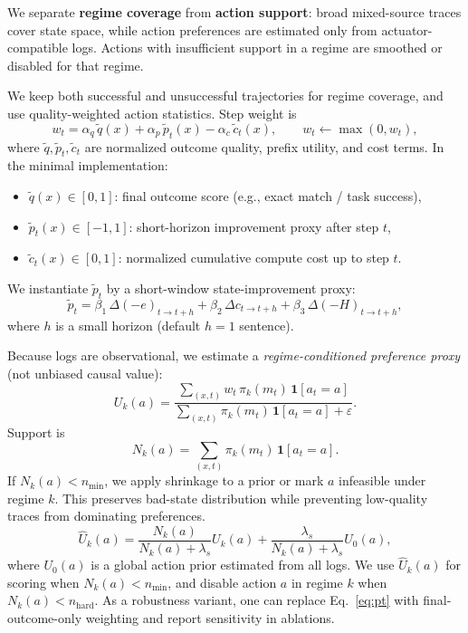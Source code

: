 \documentclass{article}
\newcommand{\eps}{\varepsilon}
\begin{document}
We separate \textbf{regime coverage} from \textbf{action support}: broad mixed-source traces cover state space, while action preferences are estimated only from actuator-compatible logs. Actions with insufficient support in a regime are smoothed or disabled for that regime.

We keep both successful and unsuccessful trajectories for regime coverage, and use quality-weighted action statistics. Step weight is
\begin{equation}
w_t=\alpha_q\,\tilde q(x)+\alpha_p\,\tilde p_t(x)-\alpha_c\,\tilde c_t(x),\qquad w_t\leftarrow \max(0,w_t),
\label{eq:wt}
\end{equation}
where $\tilde q,\tilde p_t,\tilde c_t$ are normalized outcome quality, prefix utility, and cost terms.
In the minimal implementation:
\begin{itemize}[leftmargin=1.3em, itemsep=0.2em]
    \item $\tilde q(x)\in[0,1]$: final outcome score (e.g., exact match / task success),
    \item $\tilde p_t(x)\in[-1,1]$: short-horizon improvement proxy after step $t$,
    \item $\tilde c_t(x)\in[0,1]$: normalized cumulative compute cost up to step $t$.
\end{itemize}
We instantiate $\tilde p_t$ by a short-window state-improvement proxy:
\begin{equation}
\tilde p_t = \beta_1\,\Delta(-e)_{t\rightarrow t+h} + \beta_2\,\Delta c_{t\rightarrow t+h} + \beta_3\,\Delta(-H)_{t\rightarrow t+h},
\label{eq:pt}
\end{equation}
where $h$ is a small horizon (default $h=1$ sentence).

Because logs are observational, we estimate a \emph{regime-conditioned preference proxy} (not unbiased causal value):
\begin{equation}
U_k(a) =
\frac{\sum_{(x,t)} w_t\,\pi_k(m_t)\,\mathbf{1}[a_t=a]}
{\sum_{(x,t)} \pi_k(m_t)\,\mathbf{1}[a_t=a]+\eps}.
\label{eq:uk}
\end{equation}
Support is
\begin{equation}
N_k(a)=\sum_{(x,t)} \pi_k(m_t)\,\mathbf{1}[a_t=a].
\label{eq:support}
\end{equation}
If $N_k(a)<n_{\min}$, we apply shrinkage to a prior or mark $a$ infeasible under regime $k$. This preserves bad-state distribution while preventing low-quality traces from dominating preferences.
\begin{equation}
\hat U_k(a)=\frac{N_k(a)}{N_k(a)+\lambda_s}U_k(a)+\frac{\lambda_s}{N_k(a)+\lambda_s}U_0(a),
\label{eq:shrink}
\end{equation}
where $U_0(a)$ is a global action prior estimated from all logs. We use $\hat U_k(a)$ for scoring when $N_k(a)<n_{\min}$, and disable action $a$ in regime $k$ when $N_k(a)<n_{\mathrm{hard}}$.
As a robustness variant, one can replace Eq.~\eqref{eq:pt} with final-outcome-only weighting and report sensitivity in ablations.
\end{document}
